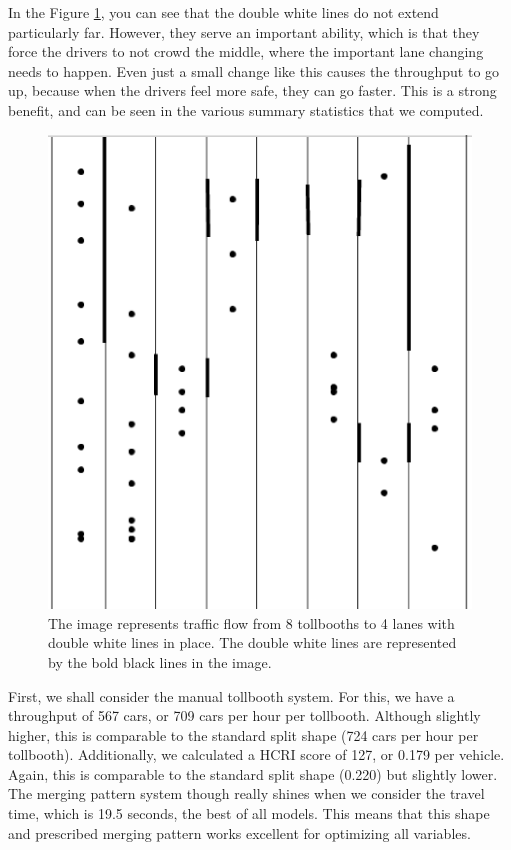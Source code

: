 \documentclass[a4paper, 11pt]{article}
\begin{document}
In the Figure \ref{fig:merge_patterns}, you can see that the double white lines do not extend particularly far. However, they serve an important ability, which is that they force the drivers to not crowd the middle, where the important lane changing needs to happen. Even just a small change like this causes the throughput to go up, because when the drivers feel more safe, they can go faster. This is a strong benefit, and can be seen in the various summary statistics that we computed. 



\begin{figure}[H]
\begin{center}
\includegraphics[scale=0.32]{Images/DoubleWhiteLines.png}
\end{center}
\caption{The image represents traffic flow from 8 tollbooths to 4 lanes with double white lines in place. The double white lines are represented by the bold black lines in the image. }
\label{fig:merge_patterns}
\end{figure}

First, we shall consider the manual tollbooth system. For this, we have a throughput of 567 cars, or 709 cars per hour per tollbooth. Although slightly higher, this is comparable to the standard split shape (724 cars per hour per tollbooth). Additionally, we calculated a HCRI score of 127, or 0.179 per vehicle. Again, this is comparable to the standard split shape (0.220) but slightly lower. The merging pattern system though really shines when we consider the travel time, which is 19.5 seconds, the best of all models. This means that this shape and prescribed merging pattern works excellent for optimizing all variables. 
\end{document}
